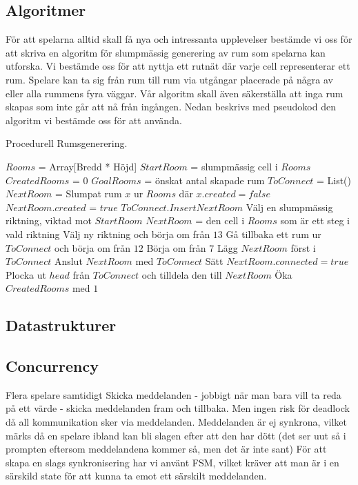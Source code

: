 \documentclass[a4paper]{article}
\begin{document}
\subsection{Algoritmer}
För att spelarna alltid skall få  nya och intressanta upplevelser bestämde vi oss för att skriva en algoritm för slumpmässig generering av rum som spelarna kan utforska. Vi
bestämde oss för att nyttja ett rutnät där varje cell representerar ett rum. Spelare kan ta sig från rum till rum via utgångar placerade på några av eller alla rummens fyra väggar.
Vår algoritm skall även säkerställa att inga rum skapas som inte går att nå från ingången. Nedan beskrivs med pseudokod den algoritm vi bestämde oss för att använda.
\begin{algorithm}
\caption{Procedurell Rumsgenerering.}
\label{alg:RoomGen}
\begin{algorithmic}[1]
\State  $Rooms$ = Array[Bredd * Höjd]
\State  $StartRoom$ = slumpmässig cell i $Rooms$
\State  $CreatedRooms$ = $0$
\State  $GoalRooms$ = önskat antal skapade rum
\Repeat
\State $ToConnect$ = List()
\State $NextRoom$  =  Slumpat rum $x$ ur $Rooms$ där $x.created = false$
\State $NextRoom.created$ = $true$
\State $ToConnect.Insert NextRoom$
\State Välj en slumpmässig riktning, viktad mot $StartRoom$
\State $NextRoom$ = den cell i $Rooms$ som är ett steg i vald riktning
\State Välj ny riktning och börja om från $13$
\State Gå tillbaka ett rum ur $ToConnect$ och börja om från $12$
\State Börja om från $7$
\EndIf
\EndIf
{}
\State Lägg $NextRoom$ först i $ToConnect$
\EndIf
\EndWhile
{}
\State Anslut $NextRoom$ med $ToConnect$
\State Sätt $NextRoom.connected = true$
\State Plocka ut $head$ från $ToConnect$ och tilldela den till $NextRoom$
\State Öka $CreatedRooms$ med $1$
\EndWhile
{}
\EndFunction
\end{algorithmic}

\end{algorithm}

\subsection{Datastrukturer}

\subsection{Concurrency}
Flera spelare samtidigt
Skicka meddelanden - jobbigt när man bara vill ta reda på ett värde - skicka meddelanden fram och tillbaka. Men ingen risk för deadlock då all kommunikation sker via meddelanden. 
Meddelanden är ej synkrona, vilket märks då en spelare ibland kan bli slagen efter att den har dött (det ser uut så i prompten eftersom meddelandena kommer så, men det är inte sant)
För att skapa en slags synkronisering har vi använt FSM, vilket kräver att man är i en särskild state för att kunna ta emot ett särskilt meddelanden. 
\end{document}
